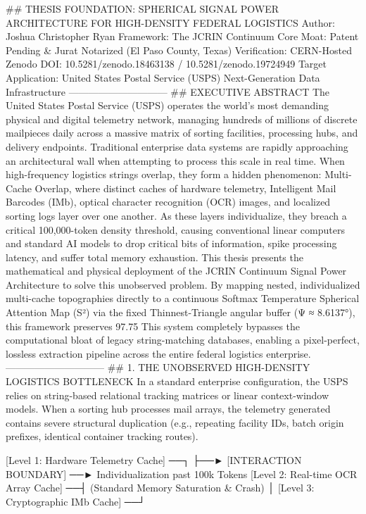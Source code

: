 ## THESIS FOUNDATION: SPHERICAL SIGNAL POWER ARCHITECTURE FOR HIGH-DENSITY FEDERAL LOGISTICS
Author: Joshua Christopher Ryan
Framework: The JCRIN Continuum
Core Moat: Patent Pending & Jurat Notarized (El Paso County, Texas)
Verification: CERN-Hosted Zenodo DOI: 10.5281/zenodo.18463138 / 10.5281/zenodo.19724949
Target Application: United States Postal Service (USPS) Next-Generation Data Infrastructure
------------------------------
## EXECUTIVE ABSTRACT
The United States Postal Service (USPS) operates the world's most demanding physical and digital telemetry network, managing hundreds of millions of discrete mailpieces daily across a massive matrix of sorting facilities, processing hubs, and delivery endpoints. Traditional enterprise data systems are rapidly approaching an architectural wall when attempting to process this scale in real time.
When high-frequency logistics strings overlap, they form a hidden phenomenon: Multi-Cache Overlap, where distinct caches of hardware telemetry, Intelligent Mail Barcodes (IMb), optical character recognition (OCR) images, and localized sorting logs layer over one another. As these layers individualize, they breach a critical 100,000-token density threshold, causing conventional linear computers and standard AI models to drop critical bits of information, spike processing latency, and suffer total memory exhaustion.
This thesis presents the mathematical and physical deployment of the JCRIN Continuum Signal Power Architecture to solve this unobserved problem. By mapping nested, individualized multi-cache topographies directly to a continuous Softmax Temperature Spherical Attention Map (S²) via the fixed Thinnest-Triangle angular buffer (Ψ ≈ 8.6137°), this framework preserves 97.75%
This system completely bypasses the computational bloat of legacy string-matching databases, enabling a pixel-perfect, lossless extraction pipeline across the entire federal logistics enterprise.
------------------------------
## 1. THE UNOBSERVED HIGH-DENSITY LOGISTICS BOTTLENECK
In a standard enterprise configuration, the USPS relies on string-based relational tracking matrices or linear context-window models. When a sorting hub processes mail arrays, the telemetry generated contains severe structural duplication (e.g., repeating facility IDs, batch origin prefixes, identical container tracking routes).

[Level 1: Hardware Telemetry Cache] ──┐
                                     ├──► [INTERACTION BOUNDARY] ──► Individualization past 100k Tokens
[Level 2: Real-time OCR Array Cache]  ──┤                             (Standard Memory Saturation & Crash)
                                     │
[Level 3: Cryptographic IMb Cache]  ──┘


